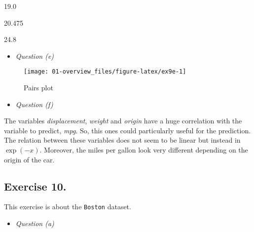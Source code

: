 \documentclass[]{book}
\newenvironment{Shaded}{\begin{snugshade}}{\end{snugshade}}
\newcommand{\DataTypeTok}[1]{\textcolor[rgb]{0.13,0.29,0.53}{#1}}
\newcommand{\KeywordTok}[1]{\textcolor[rgb]{0.13,0.29,0.53}{\textbf{#1}}}
\newcommand{\NormalTok}[1]{#1}
\newcommand{\OperatorTok}[1]{\textcolor[rgb]{0.81,0.36,0.00}{\textbf{#1}}}
\newcommand{\OtherTok}[1]{\textcolor[rgb]{0.56,0.35,0.01}{#1}}
\newcommand{\StringTok}[1]{\textcolor[rgb]{0.31,0.60,0.02}{#1}}
\providecommand{\tightlist}{%
  \setlength{\itemsep}{0pt}\setlength{\parskip}{0pt}}
\begin{document}
19.0

20.475

24.8

\begin{itemize}
\tightlist
\item
  \emph{Question (e)}
\end{itemize}

\begin{figure}

{\centering \texttt{[image: 01-overview\_files/figure-latex/ex9e-1]} 

}

\caption{Pairs plot}\label{fig:ex9e}
\end{figure}

\begin{itemize}
\tightlist
\item
  \emph{Question (f)}
\end{itemize}

The variables \emph{displacement}, \emph{weight} and \emph{origin} have a huge correlation with the variable to predict, \emph{mpg}. So, this ones could particularly useful for the prediction. The relation between these variables does not seem to be linear but instead in \(\exp(-x)\). Moreover, the miles per gallon look very different depending on the origin of the car.

\hypertarget{exercise-10.-1}{%
\subsection{Exercise 10.}\label{exercise-10.-1}}

This exercise is about the \texttt{Boston} dataset.

\begin{itemize}
\tightlist
\item
  \emph{Question (a)}
\end{itemize}

\begin{Shaded}
\end{Shaded}
\end{document}
